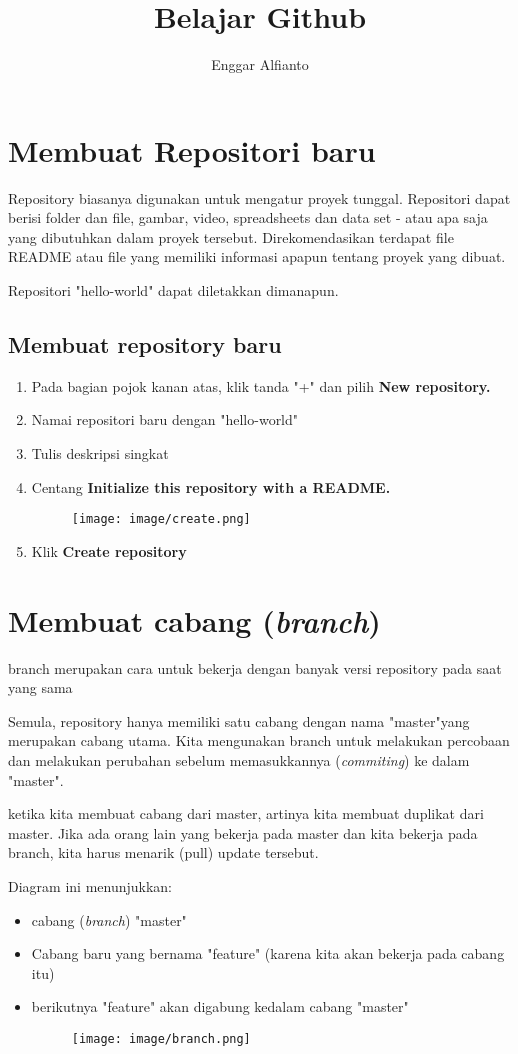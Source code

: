 \documentclass[12pt,a4paper]{article}
\author{Enggar Alfianto}
\title{Belajar Github}
\begin{document}
\maketitle
\section{Membuat Repositori baru}
Repository biasanya digunakan untuk mengatur proyek tunggal. Repositori dapat berisi folder dan file, gambar, video, spreadsheets dan data set - atau apa saja yang dibutuhkan dalam proyek tersebut. Direkomendasikan terdapat file README atau file yang memiliki informasi apapun tentang proyek yang dibuat. 

Repositori "hello-world" dapat diletakkan dimanapun.
\subsection*{Membuat repository baru}
\begin{enumerate}
\item Pada bagian pojok kanan atas, klik tanda "+" dan pilih \textbf{New repository.}
\item Namai repositori baru dengan "hello-world"
\item Tulis deskripsi singkat
\item Centang \textbf{Initialize this repository with a README.}
\begin{figure}[h!]
\texttt{[image: image/create.png]} 
\end{figure}
\item Klik \textbf{Create repository}
\end{enumerate}

\section{Membuat cabang (\textit{branch})}
branch merupakan cara untuk bekerja dengan banyak versi repository pada saat yang sama

Semula, repository hanya memiliki satu cabang dengan nama "master"yang merupakan cabang utama. Kita mengunakan branch untuk melakukan percobaan dan melakukan perubahan sebelum memasukkannya (\textit{commiting}) ke dalam "master". 

ketika kita membuat cabang dari master, artinya kita membuat duplikat dari master. Jika ada orang lain yang bekerja pada master dan kita bekerja pada branch, kita harus menarik (pull) update tersebut.

Diagram ini menunjukkan:
\begin{itemize}
\item cabang (\textit{branch}) "master"
\item Cabang baru yang bernama "feature" (karena kita akan bekerja pada cabang itu)
\item berikutnya "feature" akan digabung kedalam cabang "master"
\begin{figure}[h!]
\texttt{[image: image/branch.png]} 
\end{figure}
\end{itemize} 
\end{document}
